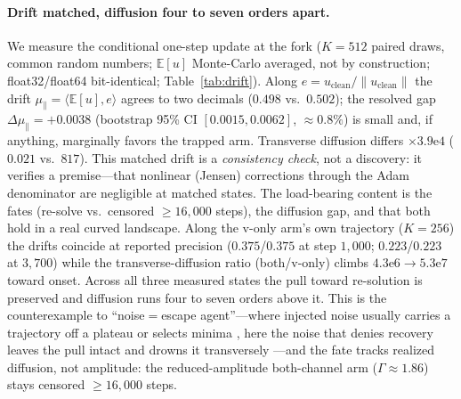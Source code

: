 \paragraph{Drift matched, diffusion four to seven orders apart.}
We measure the conditional one-step update at the fork ($K{=}512$ paired draws,
common random numbers; $\mathbb{E}[u]$ Monte-Carlo averaged, not by construction;
float32/float64 bit-identical; Table~\ref{tab:drift}). Along
$e=u_{\mathrm{clean}}/\|u_{\mathrm{clean}}\|$ the drift
$\mu_\parallel=\langle\mathbb{E}[u],e\rangle$ agrees to two decimals
($0.498$ vs.\ $0.502$); the resolved gap $\Delta\mu_\parallel=+0.0038$
(bootstrap 95\% CI $[0.0015,0.0062]$, ${\approx}0.8\%$) is small and, if anything,
marginally favors the trapped arm. Transverse diffusion differs $\times3.9\mathrm{e}4$
($0.021$ vs.\ $817$). This matched drift is a \emph{consistency check}, not a
discovery: it verifies a premise---that nonlinear (Jensen) corrections through the
Adam denominator are negligible at matched states. The load-bearing content is the
fates (re-solve vs.\ censored ${\ge}16{,}000$ steps), the diffusion gap, and that
both hold in a real curved landscape. Along the v-only arm's own trajectory
($K{=}256$) the drifts coincide at reported precision ($0.375$/$0.375$ at step
$1{,}000$; $0.223$/$0.223$ at $3{,}700$) while the transverse-diffusion ratio
(both/v-only) climbs $4.3\mathrm{e}6\!\to\!5.3\mathrm{e}7$ toward onset. Across all
three measured states the pull toward re-solution is preserved and diffusion runs
four to seven orders above it. This is the counterexample to ``noise$=$escape
agent''---where injected noise usually carries a trajectory off a plateau
\citep{saddle,zhu} or selects minima \citep{wumae,ziyin,eoss,wenfisher}, here the
noise that denies recovery leaves the pull intact and drowns it transversely
\citep{stochcollapse}---and the fate tracks realized diffusion, not amplitude: the
reduced-amplitude both-channel arm ($\Gamma\approx1.86$) stays censored
${\ge}16{,}000$ steps.

